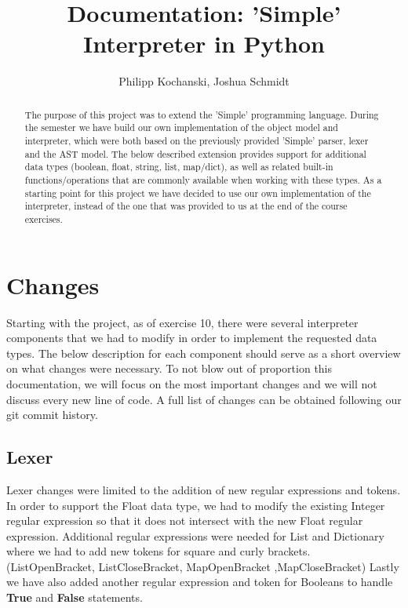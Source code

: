 \documentclass{article}
\begin{document}
\title{Documentation: 'Simple' Interpreter in Python}
\author{Philipp Kochanski, Joshua Schmidt}

\maketitle

\begin{abstract}
The purpose of this project was to extend the 'Simple' programming language.
During the semester we have build our own implementation of the object model and interpreter, which were both based
on the previously provided 'Simple' parser, lexer and the AST model. The below described extension provides support for additional data types (boolean, float, string, list, map/dict), as well as related built-in functions/operations that are commonly available when working with these types. As a starting point for this project we have decided to use our own implementation of the interpreter, instead of the one that was provided to us at the end of the course exercises. 
\end{abstract}

\section{Changes}
Starting with the project, as of exercise 10, there were several interpreter components that we had to modify in order to implement the requested data types. The below description for each component should serve as a short overview on what changes were necessary. To not blow out of proportion this documentation, we will focus on the most important changes and we will not discuss every new line of code. A full list of changes can be obtained following our git commit history.

\subsection{Lexer}
Lexer changes were limited to the addition of new regular expressions and tokens. In order to support the Float data type, we had to modify the existing Integer regular expression so that it does not intersect with the new Float regular expression. Additional regular expressions were needed for List and Dictionary where we had to add new tokens for square and curly brackets. (ListOpenBracket, ListCloseBracket, MapOpenBracket ,MapCloseBracket) Lastly we have also added another regular expression and token for Booleans to handle \textbf{True} and \textbf{False} statements.
\end{document}
